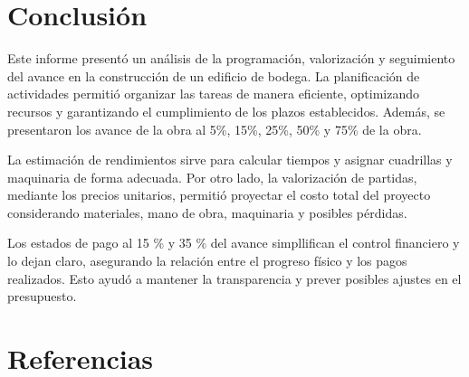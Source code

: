 \documentclass{article} %
\begin{document}
\newpage
\section{Conclusión}

Este informe presentó un análisis de la programación, valorización y seguimiento del avance en la construcción de un edificio de bodega. La planificación de actividades permitió organizar las tareas de manera eficiente, optimizando recursos y garantizando el cumplimiento de los plazos establecidos. Además, se presentaron los avance de la obra al 5\%, 15\%, 25\%, 50\% y 75\% de la obra.

La estimación de rendimientos sirve para calcular tiempos y asignar cuadrillas y maquinaria de forma adecuada. Por otro lado, la valorización de partidas, mediante los precios unitarios, permitió proyectar el costo total del proyecto considerando materiales, mano de obra, maquinaria y posibles pérdidas.

Los estados de pago al 15 \% y 35 \% del avance simpllifican el control financiero y lo dejan claro, asegurando la relación entre el progreso físico y los pagos realizados. Esto ayudó a mantener la transparencia y prever posibles ajustes en el presupuesto.

\newpage
\section{Referencias}
\nocite{*}

  
\end{document}
